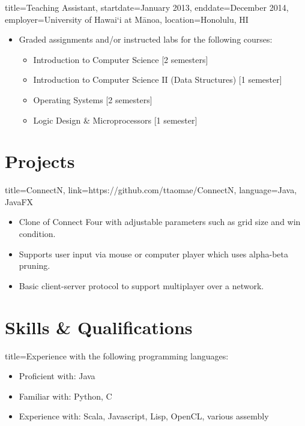 \documentclass{resume}
\newcommand{\hawaii}{Hawai\lq i}
\newcommand{\uhm}{University of \hawaii{} at M\={a}noa}
\begin{document}
\begin{job}{title=Teaching Assistant,
            startdate=January 2013,
            enddate=December 2014,
            employer=\uhm,
            location={Honolulu, HI}}
    \begin{itemize}
        \item{Graded assignments and/or instructed labs for the following courses:}
        \begin{itemize}
            \item{Introduction to Computer Science [2 semesters]}
            \item{Introduction to Computer Science II (Data Structures) [1 semester]}
            \item{Operating Systems [2 semesters]}
            \item{Logic Design \& Microprocessors [1 semester]}
        \end{itemize}
    \end{itemize}
\end{job}

\section*{Projects}
\begin{project}{title=ConnectN,
            link=https://github.com/ttaomae/ConnectN,
            language={Java, JavaFX}}
    \begin{itemize}
        \item{Clone of Connect Four with adjustable parameters such as grid size and win condition.}
        \item{Supports user input via mouse or computer player which uses alpha-beta pruning.}
        \item{Basic client-server protocol to support multiplayer over a network.}
    \end{itemize}
\end{project}

\section*{Skills \& Qualifications}
\begin{skill}{title=Experience with the following programming languages:}
    \begin{itemize}
        \item{Proficient with: Java}
        \item{Familiar with: Python, C}
        \item{Experience with: Scala, Javascript, Lisp, OpenCL, various assembly}
    \end{itemize}
\end{skill}
\end{document}
